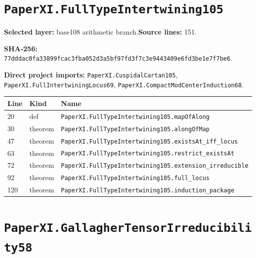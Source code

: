 \documentclass[10pt,oneside]{book}
\begin{document}
\section{\texorpdfstring{\nolinkurl{PaperXI.FullTypeIntertwining105}}{PaperXI.FullTypeIntertwining105}}\label{module:PaperXI.FullTypeIntertwining105}

\textbf{Selected layer:} base108 arithmetic branch.\quad\textbf{Source lines:} 151.\par\textbf{SHA-256:} {\scriptsize\nolinkurl{77dddac0fa33899fcac3fba052d3a5bf97fd3f7c3e9443409e6fd3be1e7f7be6}}.


\textbf{Direct project imports:} \nolinkurl{PaperXI.CuspidalCartan105}, \nolinkurl{PaperXI.FullIntertwiningLocus69}, \nolinkurl{PaperXI.CompactModCenterInduction68}.

\begin{longtable}{@{}p{}p{}p{}@{}}\toprule Line&Kind&Name\\\midrule\endhead

20&def&\nolinkurl{PaperXI.FullTypeIntertwining105.mapOfAlong}\\

30&theorem&\nolinkurl{PaperXI.FullTypeIntertwining105.alongOfMap}\\

47&theorem&\nolinkurl{PaperXI.FullTypeIntertwining105.existsAt_iff_locus}\\

63&theorem&\nolinkurl{PaperXI.FullTypeIntertwining105.restrict_existsAt}\\

72&theorem&\nolinkurl{PaperXI.FullTypeIntertwining105.extension_irreducible}\\

92&theorem&\nolinkurl{PaperXI.FullTypeIntertwining105.full_locus}\\

120&theorem&\nolinkurl{PaperXI.FullTypeIntertwining105.induction_package}\\

\bottomrule\end{longtable}

\section{\texorpdfstring{\nolinkurl{PaperXI.GallagherTensorIrreducibility58}}{PaperXI.GallagherTensorIrreducibility58}}\label{module:PaperXI.GallagherTensorIrreducibility58}
\end{document}
